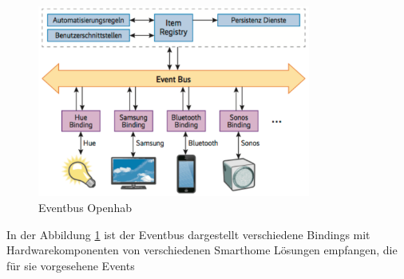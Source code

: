   \begin{figure}[H]
 	\centering
 	\includegraphics[width=0.8\textwidth]{graphics/Eventbus.PNG}
 	\caption{Eventbus Openhab \cite{noauthor_durchbruch_nodate } }	
 	\label{pic: Eventbus}
 \end{figure} 
 
 In der Abbildung \ref{pic: Eventbus} ist der Eventbus dargestellt verschiedene Bindings mit Hardwarekomponenten von verschiedenen Smarthome Lösungen empfangen, die für sie vorgesehene Events